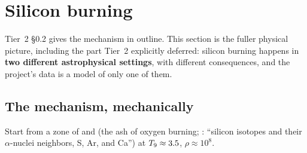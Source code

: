 %

\section{Silicon burning}
\label{part:siburn}

Tier~2 \S 0.2 gives the mechanism in outline. This section is the fuller
physical picture, including the part Tier~2 explicitly deferred: silicon
burning happens in \textbf{two different astrophysical settings}, with different
consequences, and the project's data is a model of only one of them.

\subsection{The mechanism, mechanically}
\label{sec:mechanism}

Start from a zone of  and  (the ash of oxygen burning;
\citealt[\S 1]{hix1996}: ``silicon isotopes and their $\alpha$-nuclei
neighbors, S, Ar, and Ca'') at $T_{9} \approx 3.5$, $\rho \approx 10^{8}$.

